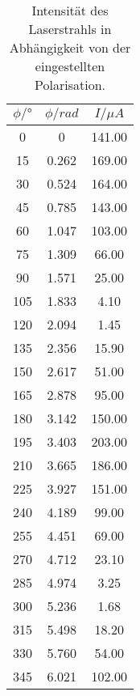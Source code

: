 \begin{table}
\centering
\caption{Intensität des Laserstrahls in Abhängigkeit von der eingestellten Polarisation.}
\label{tab:pol_data}
\begin{tabular}{c c c}
\toprule
$\phi/°$ & $\phi/rad$ & $I/\mu A$ \\
\midrule
0 & 0 & 141.00 \\
15 & 0.262 & 169.00 \\
30 & 0.524 & 164.00 \\
45 & 0.785 & 143.00 \\
60 & 1.047 & 103.00 \\
75 & 1.309 & 66.00 \\
90 & 1.571 & 25.00 \\
105 & 1.833 & 4.10 \\
120 & 2.094 & 1.45 \\
135 & 2.356 & 15.90 \\
150 & 2.617 & 51.00 \\
165 & 2.878 & 95.00 \\
180 & 3.142 & 150.00 \\
195 & 3.403 & 203.00 \\
210 & 3.665 & 186.00 \\
225 & 3.927 & 151.00 \\
240 & 4.189 & 99.00 \\
255 & 4.451 & 69.00 \\
270 & 4.712 & 23.10 \\
285 & 4.974 & 3.25 \\
300 & 5.236 & 1.68 \\
315 & 5.498 & 18.20 \\
330 & 5.760 & 54.00 \\
345 & 6.021 & 102.00 \\
\bottomrule
\end{tabular}
\end{table}

